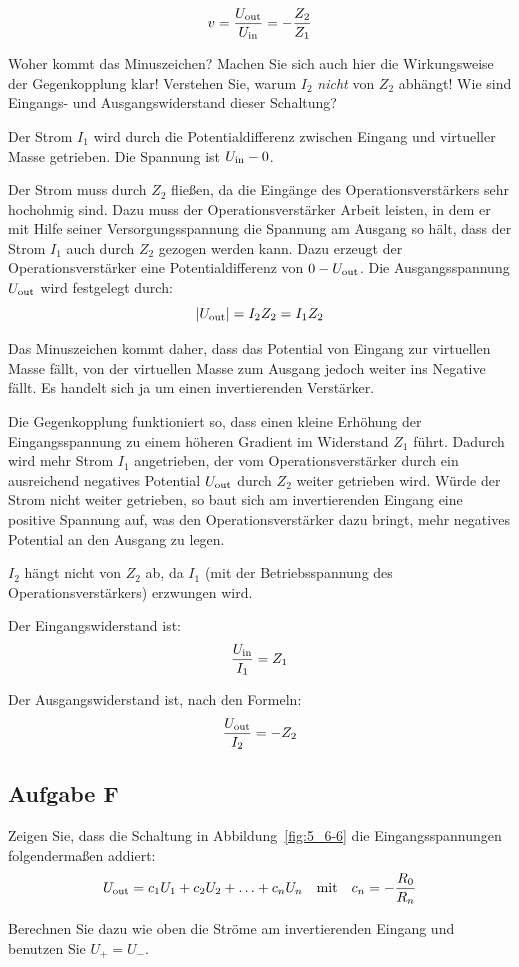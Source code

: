 \begin{problem}
	\[
		v = \frac{U_\text{out}}{U_\text{in}} = - \frac{Z_2}{Z_1}
	\]

	Woher kommt das Minuszeichen? Machen Sie sich auch hier die Wirkungsweise
	der Gegenkopplung klar! Verstehen Sie, warum $I_2$ \emph{nicht} von $Z_2$
	abhängt! Wie sind Eingangs- und Ausgangswiderstand dieser Schaltung?
\end{problem}

Der Strom $I_1$ wird durch die Potentialdifferenz zwischen Eingang und
virtueller Masse getrieben. Die Spannung ist $U_\text{in} - 0$.

Der Strom muss durch $Z_2$ fließen, da die Eingänge des Operationsverstärkers
sehr hochohmig sind. Dazu muss der Operationsverstärker Arbeit leisten, in dem
er mit Hilfe seiner Versorgungsspannung die Spannung am Ausgang so hält, dass
der Strom $I_1$ auch durch $Z_2$ gezogen werden kann. Dazu erzeugt der
Operationsverstärker eine Potentialdifferenz von $0 - U_\text{out}$. Die
Ausgangsspannung $U_\text{out}$ wird festgelegt durch:
\[
	|U_\text{out}| = I_2 Z_2 = I_1 Z_2
\]

Das Minuszeichen kommt daher, dass das Potential von Eingang zur virtuellen
Masse fällt, von der virtuellen Masse zum Ausgang jedoch weiter ins Negative
fällt. Es handelt sich ja um einen invertierenden Verstärker.

Die Gegenkopplung funktioniert so, dass einen kleine Erhöhung der
Eingangsspannung zu einem höheren Gradient im Widerstand $Z_1$ führt. Dadurch
wird mehr Strom $I_1$ angetrieben, der vom Operationsverstärker durch ein
ausreichend negatives Potential $U_\text{out}$ durch $Z_2$ weiter getrieben wird.
Würde der Strom nicht weiter getrieben, so baut sich am invertierenden Eingang
eine positive Spannung auf, was den Operationsverstärker dazu bringt, mehr
negatives Potential an den Ausgang zu legen.

$I_2$ hängt nicht von $Z_2$ ab, da $I_1$ (mit der Betriebsspannung des
Operationsverstärkers) erzwungen wird. 

Der Eingangswiderstand ist:
\[
	\frac{U_\text{in}}{I_1} = Z_1
\]

Der Ausgangswiderstand ist, nach den Formeln:
\[
	\frac{U_\text{out}}{I_2} = - Z_2
\]

\subsection{Aufgabe F}
\label{ssec:Aufgabe_F}

\begin{problem}
	Zeigen Sie, dass die Schaltung in Abbildung~\ref{fig:5_6-6} die
	Eingangsspannungen folgendermaßen addiert:
	\[
		U_\text{out} = c_1 U_1 + c_2 U_2 + \ldots + c_n U_n
		\quad \text{mit} \quad
		c_n = - \frac{R_0}{R_n}
	\]

	Berechnen Sie dazu wie oben die Ströme am invertierenden Eingang und
	benutzen Sie $U_+ = U_-$.
\end{problem}

